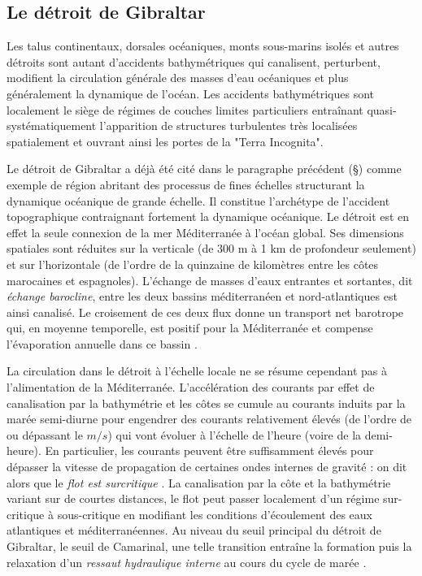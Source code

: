 
\subsection{Le détroit de Gibraltar}

Les talus continentaux, dorsales océaniques, monts sous-marins isolés et autres détroits sont autant d'accidents bathymétriques qui canalisent, perturbent, modifient la circulation générale des masses d'eau océaniques et plus généralement la dynamique de l'océan. Les accidents bathymétriques sont localement le siège de régimes de couches limites particuliers entraînant quasi-systématiquement l'apparition de structures turbulentes très localisées spatialement et ouvrant ainsi les portes de la "Terra Incognita".

Le détroit de Gibraltar a déjà été cité dans le paragraphe précédent (\S {}) comme exemple de région abritant des processus de fines échelles structurant la dynamique océanique de grande échelle. Il constitue l'archétype de l'accident topographique contraignant fortement la dynamique océanique. Le détroit est en effet la seule connexion de la mer Méditerranée à l'océan global. Ses dimensions spatiales sont réduites sur la verticale (de 300 m à 1 km de profondeur seulement) et sur l'horizontale (de l'ordre de la quinzaine de kilomètres entre les côtes marocaines et espagnoles). L'échange de masses d'eaux entrantes et sortantes, dit \textit{échange barocline}, entre les deux bassins méditerranéen et nord-atlantiques est ainsi canalisé. Le croisement de ces deux flux donne un transport net barotrope qui, en moyenne temporelle, est positif pour la Méditerranée et compense l'évaporation annuelle dans ce bassin \citep{Bryden94}.

La circulation dans le détroit à l'échelle locale ne se résume cependant pas à l'alimentation de la Méditerranée. L'accélération des courants par effet de canalisation par la bathymétrie et les côtes se cumule au courants induits par la marée semi-diurne pour engendrer des courants relativement élevés (de l'ordre de ou dépassant le $m/s$) qui vont évoluer à l'échelle de l'heure (voire de la demi-heure). En particulier, les courants peuvent être suffisamment élevés pour dépasser la vitesse de propagation de certaines ondes internes de gravité : on dit alors que le \textit{flot est surcritique} \citep{Baines1995}. La canalisation par la côte et la bathymétrie variant sur de courtes distances, le flot peut passer localement d'un régime sur-critique à sous-critique en modifiant les conditions d'écoulement des eaux atlantiques et méditerranéennes. Au niveau du seuil principal du détroit de Gibraltar, le seuil de Camarinal, une telle transition entraîne la formation puis la relaxation d'un \textit{ressaut hydraulique interne} au cours du cycle de marée \citep{FA1988}.

